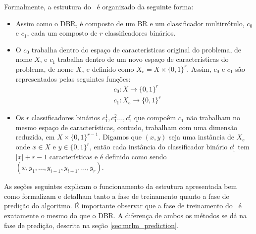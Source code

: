 Formalmente, a estrutura do \MRLMa~é organizado da seguinte forma:
\begin{itemize}
  \item Assim como o DBR, é composto de um BR e um classificador multirrótulo, $c_0$ e $c_1$,
  cada um composto de $r$ classificadores binários.
  \item O $c_0$ trabalha dentro do espaço de características original do problema, de nome $X$,
  e $c_1$ trabalha dentro de um novo espaço de características do problema, de nome $X_e$ e
   definido como $X_e=X \times \{0,1\}^{r}$. Assim, $c_0$ e $c_1$ são
  representados pelas seguintes funções:
  \begin{equation}
  \begin{split}
   & c_0 : X \rightarrow \{0,1\}^r \\
   & c_1 : X_e \rightarrow \{0,1\}^r
   \end{split}
  \end{equation}
  \item Os $r$ classificadores binários $c_1^1,c_1^2...,c_1^r$ que compoêm $c_1$ não trabalham no mesmo
  espaço de características, contudo,
  trabalham com uma dimensão reduzida, em $X \times \{0,1\}^{r-1}$. Digamos que $(x,y)$ seja uma instância de $X_e$
  onde $x \in X$ e $y \in {\{0,1\}}^r$, então cada instância 
  do classificador binário $c_1^i$ tem $|x|+r-1$ características e é definido como sendo $(x,y_1,...,y_{i-1},y_{i+1},...,y_{r})$.

  
%   
  
\end{itemize}
  As seções seguintes explicam o funcionamento da estrutura apresentada 
  bem como formalizam e detalham tanto a fase de treinamento quanto a fase de predição do algoritmo.
  É importante observar que a fase de treinamento do \MRLMa~é exatamente o mesmo do que o DBR.
  A diferença de ambos os métodos se dá na fase de predição, descrita na seção \ref{sec:mrlm_prediction}.
 
